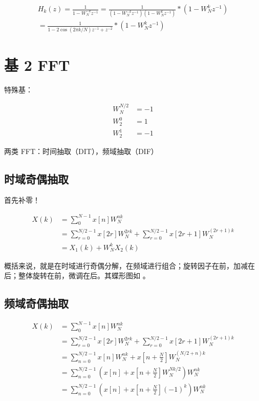 \documentclass[cn,11pt,chinese,black,simple]{elegantbook}
\begin{document}
\[
\begin{array}{l}
H_{k}(z)=\frac{1}{1-W_{N}^{-k} z^{-1}}=\frac{1}{\left(1-W_{N}^{-k} z^{-1}\right)\left(1-W_{N}^{k} z^{-1}\right)} *\left(1-W_{N}^{k} z^{-1}\right) \\
=\frac{1}{1-2 \cos (2 \pi k / N) z^{-1}+z^{-2}} *\left(1-W_{N}^{k} z^{-1}\right)
\end{array}
\]

\section{基 2 FFT}

特殊基：

\[\begin{aligned}
    W_N^{N/2} &= -1 \\ 
    W_2^0 &= 1 \\
    W_2^1 &= -1
\end{aligned}\]

两类 FFT：时间抽取（DIT），频域抽取（DIF）

\subsection{时域奇偶抽取}

首先补零！

\[\begin{aligned}
    X(k) &= \sum_0^{N-1}x[n] W_N^{nk} \\ 
    &= \sum_{r=0}^{N/2-1} x[2r] W_N^{2rk} + \sum_{r=0}^{N/2-1} x[2r+1] W_N^{(2r+1)k} \\ 
    &= X_1(k) + W_N^k X_2(k)
\end{aligned}\]

概括来说，就是在时域进行奇偶分解，在频域进行组合；旋转因子在前，加减在后；整体旋转在前，微调在后。其蝶形图如  。


\subsection{频域奇偶抽取}

\[\begin{aligned}
    X(k) &= \sum_0^{N-1}x[n] W_N^{nk} \\ 
    &= \sum_{r=0}^{N/2-1} x[2r] W_N^{2rk} + \sum_{r=0}^{N/2-1} x[2r+1] W_N^{(2r+1)k} \\  
    &= \sum_{n=0}^{N/2-1} x[n] W_N^{nk} + x[n+\frac{N}{2}] W_N^{(N/2+n)k} \\ 
    &= \sum_{n=0}^{N/2-1} (x[n] + x[n+\frac{N}{2}] W_N^{Nk/2}) W_N^{nk} \\ 
    &= \sum_{n=0}^{N/2-1} (x[n] + x[n+\frac{N}{2}] (-1)^k) W_N^{nk} \\ 
\end{aligned}\]
\end{document}
